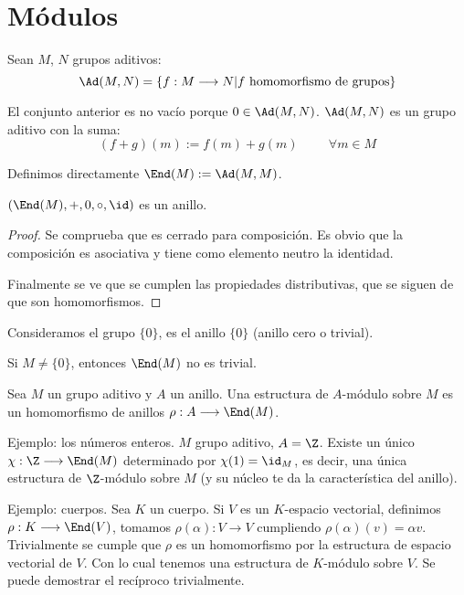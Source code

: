\section{Módulos}

\begin{df}
  Sean \(M\), \(N\) grupos aditivos:
  \[
    \Ad(M,N)=\{f:M\longrightarrow N| f\textrm{ homomorfismo de grupos}\}
  \]
\end{df}

El conjunto anterior es no vacío porque \(0\in\Ad(M,N)\).
\(\Ad(M,N)\) es un grupo aditivo con la suma:
\[
  (f+g)(m):=f(m)+g(m)\hspace{1cm} \forall m\in M
\]


\begin{df}
  Definimos directamente \(\End(M):= \Ad(M,M)\).
\end{df}

\begin{prop}
  \((\End(M),+,0,\circ,\id) \) es un anillo.
\end{prop}
\begin{proof}
  Se comprueba que es cerrado para composición. Es obvio que la
  composición es asociativa y tiene como elemento neutro la identidad.

  Finalmente se ve que se cumplen las propiedades distributivas, que
  se siguen de que son homomorfismos.
\end{proof}


\begin{obs}
  Consideramos el grupo \(\{0\}\), es el anillo \(\{0\}\) (anillo
  cero o trivial).

  Si \(M\neq \{0\}\), entonces \(\End(M)\) no es trivial.
\end{obs}

\begin{df}[Módulo]
  Sea \(M\) un grupo aditivo y \(A\) un anillo. Una estructura de
  \(A\)-módulo sobre \(M\) es un homomorfismo de anillos
  \(\rho: A\longrightarrow\End(M)\).
\end{df}

Ejemplo: los números enteros. \(M\) grupo aditivo, \(A=\Z\).
Existe un único \(\chi:\Z\longrightarrow\End(M)\) determinado
por \(\chi(1)=\id_M\), es decir, una única estructura de
\(\Z\)-módulo sobre \(M\) (y su núcleo te da la
característica del anillo).

Ejemplo: cuerpos. Sea \(K\) un cuerpo.
Si \(V\) es un \(K\)-espacio vectorial, definimos \(\rho:K\longrightarrow
\End(V)\), tomamos \(\rho(\alpha):V\longrightarrow V\)
cumpliendo \(\rho(\alpha)(v)=\alpha v\). Trivialmente se cumple que
\(\rho\) es un homomorfismo por la estructura de espacio vectorial de \(V\).
Con lo cual tenemos una estructura de \(K\)-módulo sobre \(V\).
Se puede demostrar el recíproco trivialmente.


